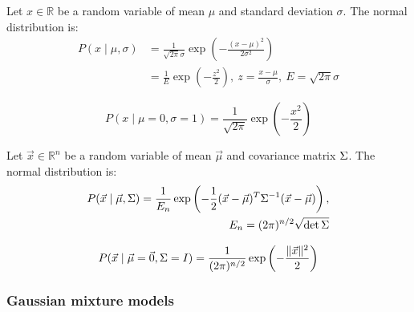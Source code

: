 \begin{dfn}
  \label{dfn:9:univariate-normal-distribution}
  Let $x \in \mathbb{R}$ be a random variable of mean $\mu$ and standard
  deviation $\sigma$.
  The normal distribution is:
  \begin{align}
    P(x \mid \mu, \sigma)
     & = \frac{1}{\sqrt{2 \pi} \sigma} \exp \left( - \frac{(x - \mu)^2}{2 \sigma^2} \right) \\
     & = \frac{1}{E} \exp \left( - \frac{z^2}{2} \right) ,\
    z = \frac{x - \mu}{\sigma} ,\
    E = \sqrt{2 \pi} \sigma
  \end{align}
\end{dfn}

\begin{dfn}
  \begin{equation}
    P(x \mid \mu = 0, \sigma = 1)
    = \frac{1}{\sqrt{2 \pi}} \exp \left( - \frac{x^2}{2} \right)
  \end{equation}
\end{dfn}

\begin{dfn}
  \label{dfn:9:multivariate-normal-distribution}
  Let $\vec{x} \in \mathbb{R}^n$ be a random variable of mean $\vec{\mu}$ and
  covariance matrix $\Sigma$.
  The normal distribution is:
  \begin{equation}
    \begin{split}
      P(\vec{x} \mid \vec{\mu}, \Sigma)
      = \frac{1}{E_n} \exp \left(
      - \frac{1}{2} (\vec{x} - \vec{\mu})^T \Sigma^{-1} (\vec{x} - \vec{\mu})
      \right) ,\\
      E_n = (2 \pi)^{n/2} \sqrt{\det \Sigma}
    \end{split}
  \end{equation}
\end{dfn}

\begin{dfn}
  \begin{equation}
    P(\vec{x} \mid \vec{\mu} = \vec{0}, \Sigma = I)
    = \frac{1}{(2 \pi)^{n / 2}} \exp \left( - \frac{\lVert \vec{x} \rVert^2}{2} \right)
  \end{equation}
\end{dfn}

\subsubsection{Gaussian mixture models}

